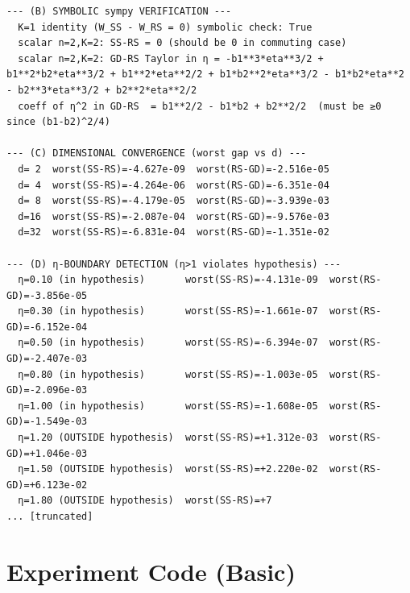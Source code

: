 \documentclass[11pt]{article}
\begin{document}
\begin{lstlisting}
--- (B) SYMBOLIC sympy VERIFICATION ---
  K=1 identity (W_SS - W_RS = 0) symbolic check: True
  scalar n=2,K=2: SS-RS = 0 (should be 0 in commuting case)
  scalar n=2,K=2: GD-RS Taylor in η = -b1**3*eta**3/2 + b1**2*b2*eta**3/2 + b1**2*eta**2/2 + b1*b2**2*eta**3/2 - b1*b2*eta**2 - b2**3*eta**3/2 + b2**2*eta**2/2
  coeff of η^2 in GD-RS  = b1**2/2 - b1*b2 + b2**2/2  (must be ≥0 since (b1-b2)^2/4)

--- (C) DIMENSIONAL CONVERGENCE (worst gap vs d) ---
  d= 2  worst(SS-RS)=-4.627e-09  worst(RS-GD)=-2.516e-05
  d= 4  worst(SS-RS)=-4.264e-06  worst(RS-GD)=-6.351e-04
  d= 8  worst(SS-RS)=-4.179e-05  worst(RS-GD)=-3.939e-03
  d=16  worst(SS-RS)=-2.087e-04  worst(RS-GD)=-9.576e-03
  d=32  worst(SS-RS)=-6.831e-04  worst(RS-GD)=-1.351e-02

--- (D) η-BOUNDARY DETECTION (η>1 violates hypothesis) ---
  η=0.10 (in hypothesis)       worst(SS-RS)=-4.131e-09  worst(RS-GD)=-3.856e-05
  η=0.30 (in hypothesis)       worst(SS-RS)=-1.661e-07  worst(RS-GD)=-6.152e-04
  η=0.50 (in hypothesis)       worst(SS-RS)=-6.394e-07  worst(RS-GD)=-2.407e-03
  η=0.80 (in hypothesis)       worst(SS-RS)=-1.003e-05  worst(RS-GD)=-2.096e-03
  η=1.00 (in hypothesis)       worst(SS-RS)=-1.608e-05  worst(RS-GD)=-1.549e-03
  η=1.20 (OUTSIDE hypothesis)  worst(SS-RS)=+1.312e-03  worst(RS-GD)=+1.046e-03
  η=1.50 (OUTSIDE hypothesis)  worst(SS-RS)=+2.220e-02  worst(RS-GD)=+6.123e-02
  η=1.80 (OUTSIDE hypothesis)  worst(SS-RS)=+7
... [truncated]
\end{lstlisting}


\section{Experiment Code (Basic)}
\end{document}
